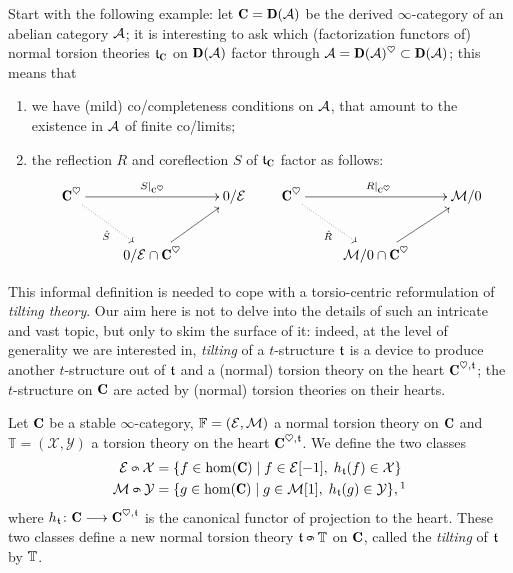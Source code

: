 Start with the following example: let $\C = \cate{D}(\A)$ be the derived $\infty$\hyp{}category of an abelian category $\mathcal{A}$; it is interesting to ask which (factorization functors of) normal torsion theories $\tee_\C$ on $\D(\A)$ factor through $\A = \D(\A)^\heart \subset \D(\A)$; this means that
\begin{enumerate}
\item we have (mild) co\fshyp{}completeness conditions on $\mathcal{A}$, that amount to the existence in $\mathcal{A}$ of finite co\fshyp{}limits;
\item the reflection $R$ and coreflection $S$ of $\tee_\C$ factor as follows:
\[
\xymatrix{
	\C^\heart \ar[rr]^{S|_{\C^\heart}}\ar@{.>}[dr]_{\hat S} && 0/ \E \\
	 & 0/\E \cap \C^\heart \ar[ur]
}\qquad
\xymatrix{
	\C^\heart \ar[rr]^{R|_{\C^\heart}}\ar@{.>}[dr]_{\hat R}  && \M/0 \\
	 & \M/0 \cap \C^\heart \ar[ur]
}
\]
\end{enumerate} 
This informal definition is needed to cope with a torsio\hyp{}centric reformulation of \emph{tilting theory}. Our aim here is not to delve into the details of such an intricate and vast topic, but only to skim the surface of it: indeed, 
at the level of generality we are interested in, \emph{tilting} of a $t$\hyp{}structure $\mathfrak{t}$ is a device to produce another $t$\hyp{}structure out of $\mathfrak{t}$ and a (normal) torsion theory on the heart $\C^{\heart, \tee}$; the $t$\hyp{}structure on $\C$ are acted by (normal) torsion theories on their hearts.
\begin{definition}
Let $\C$ be a stable $\infty$\hyp{}category, $\mathbb{F} = (\mathcal{E}, \mathcal{M})$ a normal torsion theory on $\C$ and $\mathbb{T} = (\mathcal{X}, \mathcal{Y})$ a torsion theory on the heart $\C^{\heart, \tee}$. We define the two classes
\begin{align}
\E \tilt \mathcal{X} &= \{f\in \hom(\C)\mid f\in \E [-1],\; h_\tee(f)\in \mathcal{X}\}\notag\\
\M \tilt \mathcal{Y} &= \{g\in \hom(\C)\mid g\in \M [1], \; h_\tee(g)\in \mathcal{Y}\},\footnotemark
\end{align}
where $h_\tee\colon \C \to \C^{\heart,\tee}$ is the canonical functor of projection to the heart. These two classes define a new normal torsion theory $\tee \tilt \mathbb{T}$ on $\C$, called the \emph{tilting} of $\mathfrak{t}$ by $\mathbb{T}$.
\end{definition}
